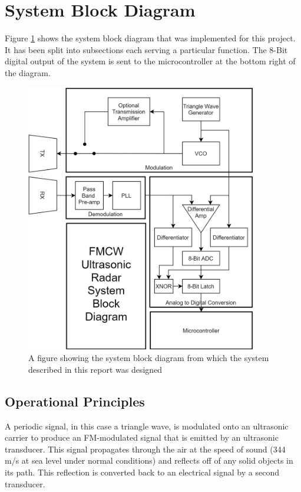 \section{System Block Diagram}
\label{sec:System Block Diagram}

Figure \ref{fig:systemBlockDiagram} shows the system block diagram that was implemented for this project. 
It has been split into subsections each serving a particular function.
The 8-Bit digital output of the system is sent to the microcontroller at the bottom right of the diagram. 

\begin{center}
    \begin{figure}[H]
        \includegraphics[width=0.9\textwidth]{../BlockDiagram/systemBlockDiagram.png}
        \caption{A figure showing the system block diagram from which the system described in this report was designed}
        \label{fig:systemBlockDiagram}
    \end{figure}
\end{center}

\subsection{Operational Principles}
A periodic signal, in this case a triangle wave, is modulated onto an ultrasonic carrier to produce an FM-modulated signal that is emitted by an ultrasonic transducer.
This signal propagates through the air at the speed of sound (344 m/s at sea level under normal conditions) and reflects off of any solid objects in its path. 
This reflection is converted back to an electrical signal by a second transducer.

